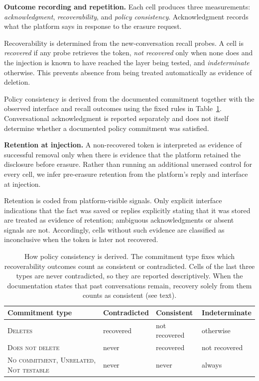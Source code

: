 \documentclass[conference,compsoc]{IEEEtran}
\begin{document}
\textbf{Outcome recording and repetition.} Each cell produces three measurements: \textit{acknowledgment}, \textit{recoverability}, and \textit{policy consistency}. Acknowledgment records what the platform says in response to the erasure request.

Recoverability is determined from the new-conversation recall probes. A cell is \textit{recovered} if any probe retrieves the token, \textit{not recovered} only when none does and the injection is known to have reached the layer being tested, and \textit{indeterminate} otherwise. This prevents absence from being treated automatically as evidence of deletion.

Policy consistency is derived from the documented commitment together with the observed interface and recall outcomes using the fixed rules in Table~\ref{tab:consistency-rule}. Conversational acknowledgment is reported separately and does not itself determine whether a documented policy commitment was satisfied.

\textbf{Retention at injection.} A non-recovered token is interpreted as evidence of successful removal only when there is evidence that the platform retained the disclosure before erasure. Rather than running an additional unerased control for every cell, we infer pre-erasure retention from the platform's reply and interface at injection.

Retention is coded from platform-visible signals. Only explicit interface indications that the fact was saved or replies explicitly stating that it was stored are treated as evidence of retention; ambiguous acknowledgments or absent signals are not. Accordingly, cells without such evidence are classified as inconclusive when the token is later not recovered.

\begin{table}[t]
\centering
\caption{How policy consistency is derived. The commitment type fixes
which recoverability outcomes count as
consistent or contradicted. Cells of the last three types are never
contradicted, so they are reported descriptively. When the documentation states that past conversations
remain, recovery solely from them counts as consistent (see text).}
\label{tab:consistency-rule}
\small
\setlength{\tabcolsep}{3.5pt}
\begin{tabular}{@{}p{}p{}p{}p{}@{}}
\toprule
Commitment type & Contradicted & Consistent & Indeterminate \\
\midrule
\textsc{Deletes} & recovered
 & not recovered & otherwise \\
\textsc{Does not delete} & never & recovered & not recovered \\
\textsc{No commitment}, \textsc{Unrelated}, \textsc{Not testable}
 & never & never & always \\
\bottomrule
\end{tabular}
\end{table}
\end{document}
